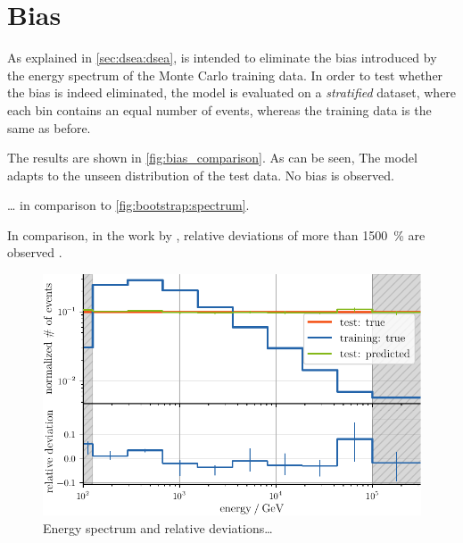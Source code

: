 \clearpage %
\section{Bias}
As explained in \autoref{sec:dsea:dsea},
\dsea{} is intended to eliminate the bias introduced by the energy spectrum of the Monte Carlo training data.
%
In order to test
whether the bias is indeed eliminated,
the model is evaluated on a \emph{stratified} dataset,
    where each bin contains an equal number of events,
whereas the training data is the same as before.

The results are shown in \autoref{fig:bias_comparison}.
As can be seen,
The model adapts to the unseen distribution of the test data.
No bias is observed.

… in comparison to \autoref{fig:bootstrap:spectrum}.

In comparison,
in the work by \citeauthor{dsea_samuel},
relative deviations of more than \SI{1500}{\percent} are observed \cite{dsea_samuel}.


\begin{figure}
  \centering
  \includegraphics[scale=1]{content/plots/bias:spectrum_full.pdf}
  \caption{
    Energy spectrum and relative deviations…
  }
  \label{fig:bias_comparison}
\end{figure}
